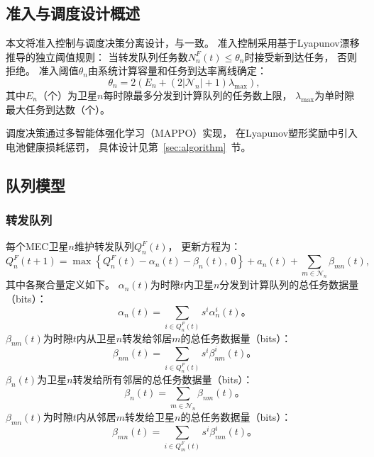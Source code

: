 \documentclass[a4paper,11pt]{article}
\begin{document}
\subsection{准入与调度设计概述}

本文将准入控制与调度决策分离设计，与\cite{zhang2024mhspo}一致。
准入控制采用基于Lyapunov漂移推导的独立阈值规则：
当转发队列任务数$N^F_n(t) \leq \theta_n$时接受新到达任务，
否则拒绝。
准入阈值$\theta_n$由系统计算容量和任务到达率离线确定：
\begin{equation}
    \theta_n = 2\left(E_n
    + (2|\mathcal{N}_n|+1)\lambda_{\max}\right),
    \label{eq:theta}
\end{equation}
其中$E_n$（个）为卫星$n$每时隙最多分发到计算队列的任务数上限，
$\lambda_{\max}$为单时隙最大任务到达数（个）。

调度决策通过多智能体强化学习（MAPPO）实现，
在Lyapunov塑形奖励中引入电池健康损耗惩罚，
具体设计见第~\ref{sec:algorithm}~节。

\subsection{队列模型}

\subsubsection{转发队列}

每个MEC卫星$n$维护转发队列$Q^F_n(t)$，
更新方程为\cite{zhang2024mhspo}：
\begin{equation}
    Q^F_n(t\!+\!1) = \max\!\left\{Q^F_n(t)
    - \alpha_n(t) - \beta_n(t),~0\right\}
    + a_n(t)
    + \sum_{m \in \mathcal{N}_n}\!\beta_{mn}(t),
    \label{eq:QF_update}
\end{equation}
其中各聚合量定义如下。
$\alpha_n(t)$为时隙$t$内卫星$n$分发到计算队列的总任务数据量（bits）：
\begin{equation}
    \alpha_n(t) = \sum_{i \in Q^F_n(t)} s^i \alpha^i_n(t)。
\end{equation}
$\beta_{nm}(t)$为时隙$t$内从卫星$n$转发给邻居$m$的总任务数据量（bits）：
\begin{equation}
    \beta_{nm}(t) = \sum_{i \in Q^F_n(t)} s^i \beta^i_{nm}(t)。
\end{equation}
$\beta_n(t)$为卫星$n$转发给所有邻居的总任务数据量（bits）：
\begin{equation}
    \beta_n(t) = \sum_{m \in \mathcal{N}_n} \beta_{nm}(t)。
\end{equation}
$\beta_{mn}(t)$为时隙$t$内从邻居$m$转发给卫星$n$的总任务数据量（bits）：
\begin{equation}
    \beta_{mn}(t) = \sum_{i \in Q^F_m(t)} s^i \beta^i_{mn}(t)。
\end{equation}
\end{document}
